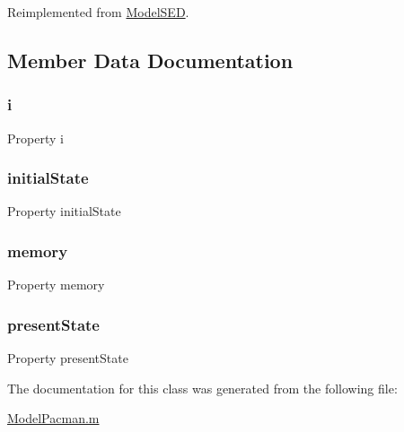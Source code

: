 Reimplemented from \hyperlink{class_model_s_e_d_adb8aaccb857cf5bbec640cd00915459d}{Model\+S\+ED}.



\subsection{Member Data Documentation}
\mbox{\label{class_model_pacman_a103c618d75e54c3a72fac6bcaa59f61f}} 
\subsubsection{\texorpdfstring{i}{i}}
{\footnotesize\ttfamily Property i}

\mbox{\label{class_model_pacman_acd9263acfa96c9138afdf497e55acc24}} 
\subsubsection{\texorpdfstring{initial\+State}{initialState}}
{\footnotesize\ttfamily Property initial\+State}

\mbox{\label{class_model_pacman_a9a61c54203464d470acd8580a6464f8e}} 
\subsubsection{\texorpdfstring{memory}{memory}}
{\footnotesize\ttfamily Property memory}

\mbox{\label{class_model_pacman_a9624cc7c421a50fa5086b0ebd0cd5fe3}} 
\subsubsection{\texorpdfstring{present\+State}{presentState}}
{\footnotesize\ttfamily Property present\+State}



The documentation for this class was generated from the following file\+:\begin{DoxyCompactItemize}
\item 
\hyperlink{_model_pacman_8m}{Model\+Pacman.\+m}\end{DoxyCompactItemize}
